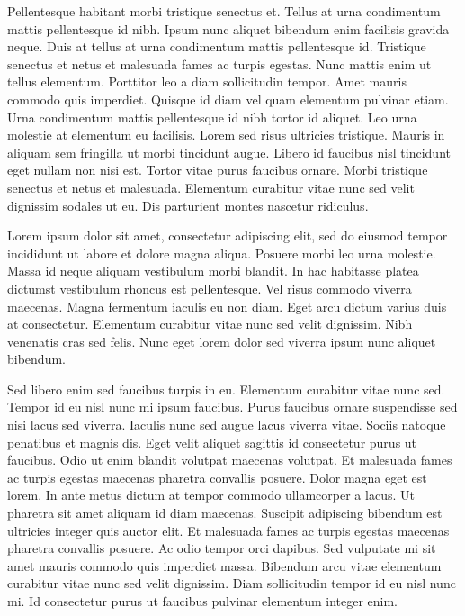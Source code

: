 Pellentesque habitant morbi tristique senectus et. Tellus at urna condimentum mattis pellentesque id nibh. Ipsum nunc aliquet bibendum enim facilisis gravida neque. Duis at tellus at urna condimentum mattis pellentesque id. Tristique senectus et netus et malesuada fames ac turpis egestas. Nunc mattis enim ut tellus elementum. Porttitor leo a diam sollicitudin tempor. Amet mauris commodo quis imperdiet. Quisque id diam vel quam elementum pulvinar etiam. Urna condimentum mattis pellentesque id nibh tortor id aliquet. Leo urna molestie at elementum eu facilisis. Lorem sed risus ultricies tristique. Mauris in aliquam sem fringilla ut morbi tincidunt augue. Libero id faucibus nisl tincidunt eget nullam non nisi est. Tortor vitae purus faucibus ornare. Morbi tristique senectus et netus et malesuada. Elementum curabitur vitae nunc sed velit dignissim sodales ut eu. Dis parturient montes nascetur ridiculus. \cite{Milankovitch}

Lorem ipsum dolor sit amet, consectetur adipiscing elit, sed do eiusmod tempor incididunt ut labore et dolore magna aliqua. Posuere morbi leo urna molestie. Massa id neque aliquam vestibulum morbi blandit. In hac habitasse platea dictumst vestibulum rhoncus est pellentesque. Vel risus commodo viverra maecenas. Magna fermentum iaculis eu non diam. Eget arcu dictum varius duis at consectetur. Elementum curabitur vitae nunc sed velit dignissim. Nibh venenatis cras sed felis. Nunc eget lorem dolor sed viverra ipsum nunc aliquet bibendum.

Sed libero enim sed faucibus turpis in eu. Elementum curabitur vitae nunc sed. Tempor id eu nisl nunc mi ipsum faucibus. Purus faucibus ornare suspendisse sed nisi lacus sed viverra. Iaculis nunc sed augue lacus viverra vitae. Sociis natoque penatibus et magnis dis. Eget velit aliquet sagittis id consectetur purus ut faucibus. Odio ut enim blandit volutpat maecenas volutpat. Et malesuada fames ac turpis egestas maecenas pharetra convallis posuere. Dolor magna eget est lorem. In ante metus dictum at tempor commodo ullamcorper a lacus. Ut pharetra sit amet aliquam id diam maecenas. Suscipit adipiscing bibendum est ultricies integer quis auctor elit. Et malesuada fames ac turpis egestas maecenas pharetra convallis posuere. Ac odio tempor orci dapibus. Sed vulputate mi sit amet mauris commodo quis imperdiet massa. Bibendum arcu vitae elementum curabitur vitae nunc sed velit dignissim. Diam sollicitudin tempor id eu nisl nunc mi. Id consectetur purus ut faucibus pulvinar elementum integer enim.

